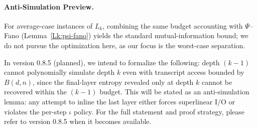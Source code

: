 \paragraph{Anti-Simulation Preview.}
\begin{remark}\label{Lk:avg-fano}
For average-case instances of $L_k$, combining the same budget accounting with $\Psi$--Fano (Lemma~\ref{Lk:psi-fano}) yields the standard mutual-information bound; we do not pursue the optimization here, as our focus is the worst-case separation.
\end{remark}
In version 0.8.5 (planned), we intend to formalize the following: depth $(k{-}1)$ cannot polynomially simulate depth $k$ even with transcript access bounded by $B(d,n)$, since the final-layer entropy revealed only at depth $k$ cannot be recovered within the $(k{-}1)$ budget. This will be stated as an anti-simulation lemma: any attempt to inline the last layer either forces superlinear I/O or violates the per-step $\iota$ policy. For the full statement and proof strategy, please refer to version 0.8.5 when it becomes available.

